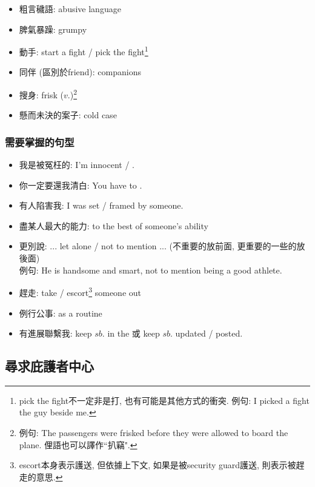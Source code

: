 \begin{multicols}{2}
\begin{itemize}
  \item 粗言穢語: abusive language
  \item 脾氣暴躁: grumpy
  \item 動手: start a fight / pick the fight\footnote{pick the fight不一定非是打, 也有可能是其他方式的衝突. 例句: I picked a fight  the guy beside me.}
  \item 同伴 (區別於friend): companions
  \item 搜身: frisk ($v.$)\footnote{例句: The passengers were frisked before they were allowed to board the plane. 俚語也可以譯作``扒竊".}
  \item 懸而未決的案子: cold case
\end{itemize}
\end{multicols}

\subsubsection*{需要掌握的句型}
\begin{itemize}
  \itemsep0em
  \item 我是被冤枉的: I'm innocent / .
  \item 你一定要還我清白: You have to .
  \item 有人陷害我: I was set / framed by someone.
  \item 盡某人最大的能力: to the best of someone's ability
  \item 更別說: ... let alone / not to mention ... (不重要的放前面, 更重要的一些的放後面)\\例句: He is handsome and smart, not to mention being a good athlete.
  \item 趕走: take / escort\footnote{escort本身表示護送, 但依據上下文, 如果是被security guard護送, 則表示被趕走的意思.} someone out
  \item 例行公事: as a routine
  \item 有進展聯繫我: keep $sb.$ in the  或 keep $sb.$ updated / posted.
\end{itemize}

\subsection{尋求庇護者中心}
